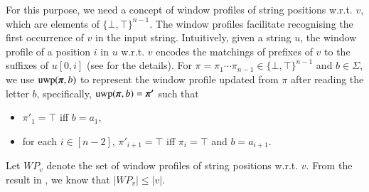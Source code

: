 For this purpose, we need a concept of window profiles of  string positions w.r.t. $v$, which are elements of $\{\bot, \top\}^{n-1}$. The window profiles facilitate recognising the first occurrence of $v$ in the input string.  Intuitively, given a string $u$, the window profile of a position $i$ in $u$ w.r.t. $v$ encodes the matchings of prefixes of $v$ to the suffixes of $u[0,i]$ (see \cite{CCH+18} for the details). For $\pi = \pi_1 \cdots \pi_{n-1} \in \{\bot, \top\}^{n-1}$ and $b \in \Sigma$, we use $\uwp(\vec{\pi}, b)$ to represent the window profile updated from $\pi$ after reading the letter $b$, specifically, $\uwp(\vec{\pi}, b) = \vec{\pi'}$ such that  
\begin{itemize}
\item $\pi'_1 = \top$ iff $b = a_1$, 
%
\item for each $i \in [n-2]$, $\pi'_{i+1} = \top$ iff $\pi_{i} = \top$ and $b = a_{i+1}$. 
\end{itemize}
Let $WP_v$ denote the set of window profiles of string positions w.r.t. $v$. From the result in \cite{CCH+18}, we know that $|WP_v| \le |v|$. 

